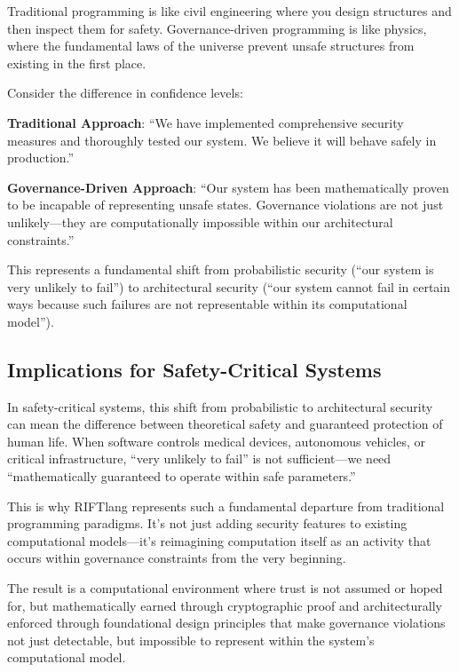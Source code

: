 Traditional programming is like civil engineering where you design structures and then inspect them for safety. Governance-driven programming is like physics, where the fundamental laws of the universe prevent unsafe structures from existing in the first place.

Consider the difference in confidence levels:

\textbf{Traditional Approach}: ``We have implemented comprehensive security measures and thoroughly tested our system. We believe it will behave safely in production.''

\textbf{Governance-Driven Approach}: ``Our system has been mathematically proven to be incapable of representing unsafe states. Governance violations are not just unlikely—they are computationally impossible within our architectural constraints.''

This represents a fundamental shift from probabilistic security (``our system is very unlikely to fail'') to architectural security (``our system cannot fail in certain ways because such failures are not representable within its computational model'').

\subsection{Implications for Safety-Critical Systems}

In safety-critical systems, this shift from probabilistic to architectural security can mean the difference between theoretical safety and guaranteed protection of human life. When software controls medical devices, autonomous vehicles, or critical infrastructure, ``very unlikely to fail'' is not sufficient—we need ``mathematically guaranteed to operate within safe parameters.''

This is why RIFTlang represents such a fundamental departure from traditional programming paradigms. It's not just adding security features to existing computational models—it's reimagining computation itself as an activity that occurs within governance constraints from the very beginning.

The result is a computational environment where trust is not assumed or hoped for, but mathematically earned through cryptographic proof and architecturally enforced through foundational design principles that make governance violations not just detectable, but impossible to represent within the system's computational model.